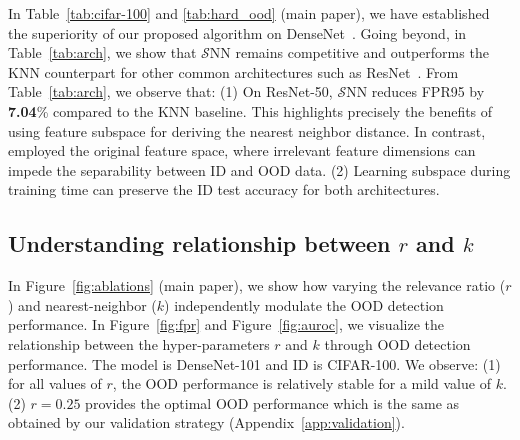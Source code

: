 \documentclass[letterpaper]{article} %
\def\name{$\mathcal{S}$NN\xspace}
\theoremstyle{plain}
\theoremstyle{definition}
\theoremstyle{remark}
\begin{document}
 In Table~\ref{tab:cifar-100} and \ref{tab:hard_ood} (main paper), we have established the superiority of our proposed algorithm on DenseNet~\cite{huang2018densely}. Going beyond, in Table~\ref{tab:arch}, we show that \name remains competitive and outperforms the KNN counterpart for other common architectures such as ResNet~\cite{he2016deep}. From Table~\ref{tab:arch}, we observe that: (1) On ResNet-50, \name reduces FPR95 by \textbf{7.04}\% compared to the KNN baseline. This highlights precisely the benefits of using feature subspace for deriving the nearest neighbor distance. In contrast, \cite{sun2022knn} employed the original feature space, where irrelevant feature dimensions can impede the separability between ID and OOD data.
(2) Learning subspace during training time can preserve the ID test accuracy for both architectures. 



\subsection{Understanding relationship between $r$ and $k$}
\label{app:rel}

In Figure~\ref{fig:ablations} (main paper), we show how varying the relevance ratio ($r$) and nearest-neighbor ($k$) independently modulate the OOD detection performance. In Figure~\ref{fig:fpr} and Figure~\ref{fig:auroc}, we visualize the relationship between the hyper-parameters $r$ and $k$ through OOD detection performance. The model is DenseNet-101 and ID is CIFAR-100. We observe: (1) for all values of $r$, the OOD performance is relatively stable for a mild value of $k$. (2) $r=0.25$ provides the optimal OOD performance which is the same as obtained by our validation strategy (Appendix~\ref{app:validation}).
\end{document}

